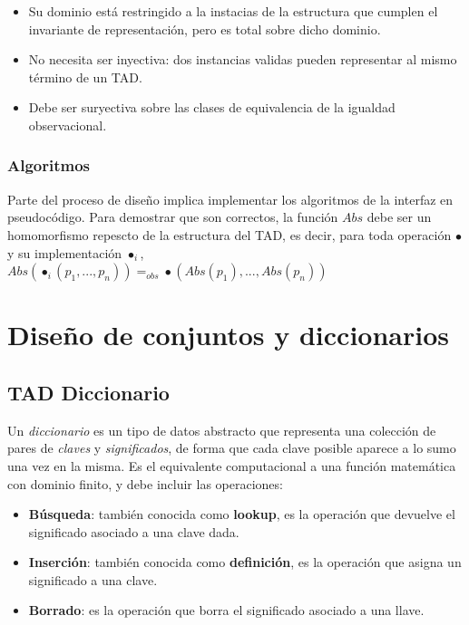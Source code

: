 \documentclass{article}
\begin{document}
\begin{itemize}
    \item Su dominio está restringido a la instacias de la estructura que cumplen el invariante de representación, pero es total sobre dicho dominio.
    \item No necesita ser inyectiva: dos instancias validas pueden representar al mismo término de un TAD.
    \item Debe ser suryectiva sobre las clases de equivalencia de la igualdad observacional.
\end{itemize}

\subsubsection{Algoritmos}

Parte del proceso de diseño implica implementar los algoritmos de la interfaz en pseudocódigo. Para demostrar que son correctos, la función $Abs$ debe ser un homomorfismo repescto de la estructura del TAD, es decir, para toda operación $\bullet$ y su implementación $\bullet_i$, $Abs(\bullet_i(p_1, ..., p_n)) =_{obs} \bullet(Abs(p_1), ..., Abs(p_n))$

\section{Diseño de conjuntos y diccionarios}

\subsection{TAD Diccionario}

Un \textit{diccionario} es un tipo de datos abstracto que representa una colección de pares de \textit{claves} y \textit{significados}, de forma que cada clave posible aparece a lo sumo una vez en la misma. Es el equivalente computacional a una función matemática con dominio finito, y debe incluir las operaciones:

\begin{itemize}
    \item \textbf{Búsqueda}: también conocida como \textbf{lookup}, es la operación que devuelve el significado asociado a una clave dada.
    \item \textbf{Inserción}: también conocida como \textbf{definición}, es la operación que asigna un significado a una clave.
    \item \textbf{Borrado}: es la operación que borra el significado asociado a una llave.
\end{itemize}
\end{document}
